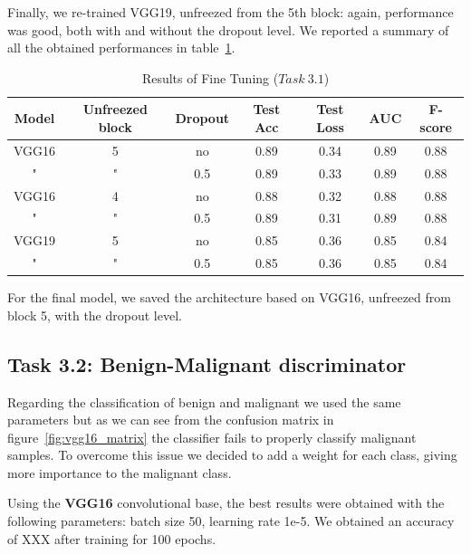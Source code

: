 \documentclass[11pt,a4paper,oneside]{article}
\begin{document}
Finally, we re-trained VGG19, unfreezed from the 5th block: again, performance was good, both with and without the dropout level. We reported a summary of all the obtained performances in table~\ref{tab:task3.1_ft}.

\begin{table}[h]
\centering
\begin{tabular}{|ccc|cccc|}
\hline
Model & Unfreezed block & Dropout & Test Acc & Test Loss & AUC & F-score \\
\hline
VGG16 & 5 & no & 0.89 & 0.34 & 0.89 & 0.88 \\
" & " & 0.5 & 0.89 & 0.33 & 0.89 & 0.88 \\
VGG16 & 4 & no & 0.88 & 0.32 & 0.88 & 0.88 \\
" & " & 0.5 &  0.89 & 0.31 & 0.89 & 0.88 \\
VGG19 & 5 & no & 0.85 & 0.36 & 0.85 & 0.84 \\
" & " & 0.5 & 0.85 & 0.36 & 0.85 & 0.84 \\
\hline
\end{tabular}
\caption{Results of Fine Tuning ($Task\ 3.1$)}
\label{tab:task3.1_ft}
\end{table}

For the final model, we saved the architecture based on VGG16, unfreezed from block 5, with the dropout level.

\clearpage

\subsection{Task 3.2: Benign-Malignant discriminator}
Regarding the classification of benign and malignant we used the same parameters but as we can see from the confusion matrix in figure~\ref{fig:vgg16_matrix} the classifier fails to properly classify malignant samples. To overcome this issue we decided to add a weight for each class, giving more importance to the malignant class. 

Using the \textbf{VGG16} convolutional base, the best results were obtained with the following parameters: batch size 50, learning rate 1e-5. We obtained an accuracy of XXX after training for 100 epochs. 
\end{document}
